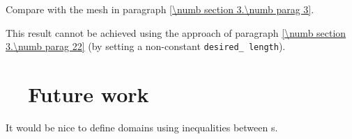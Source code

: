 Compare with the mesh in paragraph \ref{\numb section 3.\numb parag 3}.

This result cannot be achieved using the approach of paragraph
\ref{\numb section 3.\numb parag 22} (by setting a non-constant {\small\tt desired\_\,length}).


\section{~~Future work}\label{\numb section 3.\numb parag 25}

It would be nice to define domains using inequalities between {\small\tt {}}s.

